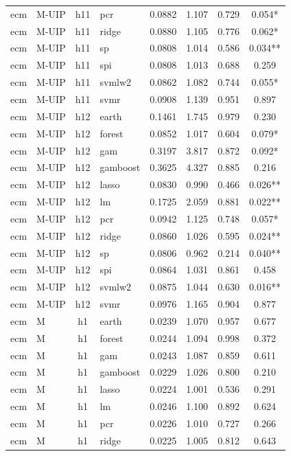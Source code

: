 \begin{ThreePartTable}
\begin{longtable}[t]{llclcccc}
ecm & M-UIP & h11 & pcr & 0.0882 & 1.107 & 0.729 & 0.054*\\
ecm & M-UIP & h11 & ridge & 0.0880 & 1.105 & 0.776 & 0.062*\\
ecm & M-UIP & h11 & sp & 0.0808 & 1.014 & 0.586 & 0.034**\\
ecm & M-UIP & h11 & spi & 0.0808 & 1.013 & 0.688 & 0.259\\
ecm & M-UIP & h11 & svmlw2 & 0.0862 & 1.082 & 0.744 & 0.055*\\
ecm & M-UIP & h11 & svmr & 0.0908 & 1.139 & 0.951 & 0.897\\
\addlinespace
ecm & M-UIP & h12 & earth & 0.1461 & 1.745 & 0.979 & 0.230\\
ecm & M-UIP & h12 & forest & 0.0852 & 1.017 & 0.604 & 0.079*\\
ecm & M-UIP & h12 & gam & 0.3197 & 3.817 & 0.872 & 0.092*\\
ecm & M-UIP & h12 & gamboost & 0.3625 & 4.327 & 0.885 & 0.216\\
ecm & M-UIP & h12 & lasso & 0.0830 & 0.990 & 0.466 & 0.026**\\
ecm & M-UIP & h12 & lm & 0.1725 & 2.059 & 0.881 & 0.022**\\
ecm & M-UIP & h12 & pcr & 0.0942 & 1.125 & 0.748 & 0.057*\\
ecm & M-UIP & h12 & ridge & 0.0860 & 1.026 & 0.595 & 0.024**\\
ecm & M-UIP & h12 & sp & 0.0806 & 0.962 & 0.214 & 0.040**\\
ecm & M-UIP & h12 & spi & 0.0864 & 1.031 & 0.861 & 0.458\\
ecm & M-UIP & h12 & svmlw2 & 0.0875 & 1.044 & 0.630 & 0.016**\\
ecm & M-UIP & h12 & svmr & 0.0976 & 1.165 & 0.904 & 0.877\\
\addlinespace
ecm & M & h1 & earth & 0.0239 & 1.070 & 0.957 & 0.677\\
ecm & M & h1 & forest & 0.0244 & 1.094 & 0.998 & 0.372\\
ecm & M & h1 & gam & 0.0243 & 1.087 & 0.859 & 0.611\\
ecm & M & h1 & gamboost & 0.0229 & 1.026 & 0.800 & 0.210\\
ecm & M & h1 & lasso & 0.0224 & 1.001 & 0.536 & 0.291\\
ecm & M & h1 & lm & 0.0246 & 1.100 & 0.892 & 0.624\\
ecm & M & h1 & pcr & 0.0226 & 1.010 & 0.727 & 0.266\\
ecm & M & h1 & ridge & 0.0225 & 1.005 & 0.812 & 0.643\\

\end{longtable}
\end{ThreePartTable}
